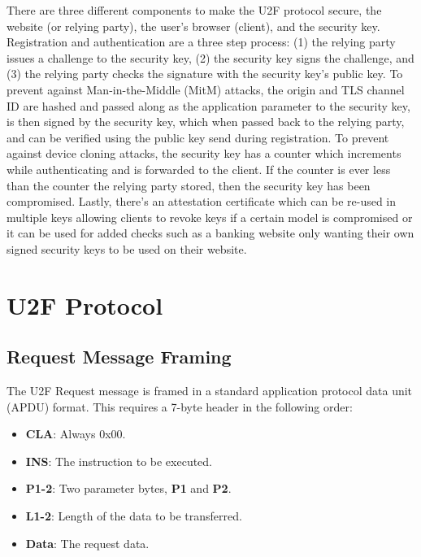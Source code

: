 \documentclass[acmtog,review]{acmart}
\begin{document}
There are three different components to make the U2F protocol secure, the website (or relying 
party), the user's browser (client), and the security key. Registration and authentication 
are a three step process: (1) the relying party issues a challenge to the security key, 
(2) the security key signs the challenge, and (3) the relying party checks the signature 
with the security key's public key. To prevent against Man-in-the-Middle (MitM) attacks, 
the origin and TLS channel ID are hashed and passed along as the application parameter to the security 
key, is then signed by the security key, which when passed back to the relying party, and can be verified using the public key send during registration. To prevent against device 
cloning attacks, the security key has a counter which increments while authenticating and is forwarded to the client. If the counter is ever less than the counter the relying party
stored, then the security key has been compromised.
Lastly, there's an attestation
certificate which can be re-used in multiple keys allowing clients to revoke keys if a certain model is compromised or it can be used for added checks 
such as a banking website only wanting their own signed security keys to be used on their website.


\section{U2F Protocol}
\label{u2f_protocol}

\subsection{Request Message Framing}

The U2F Request message is framed in a standard application protocol data unit (APDU) format. This requires a 7-byte header in the following order:

\begin{itemize}
    \item \textbf{CLA}: Always 0x00.
    \item \textbf{INS}: The instruction to be executed.
    \item \textbf{P1-2}: Two parameter bytes, \textbf{P1} and \textbf{P2}.
    \item \textbf{L1-2}: Length of the data to be transferred.
    \item \textbf{Data}: The request data.
\end{itemize}
\end{document}

